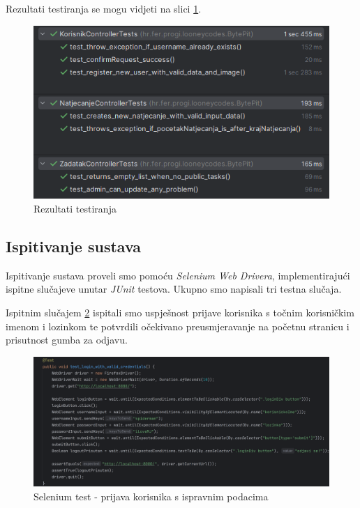 \noindent Rezultati testiranja se mogu vidjeti na slici \ref{fig:test_rezultati}.

\begin{figure}[H]
	\includegraphics[scale=0.8]{slike/test_rezultati.png}
	\centering
	\caption{Rezultati testiranja}
	\label{fig:test_rezultati}
\end{figure}

\subsection{Ispitivanje sustava}

Ispitivanje sustava proveli smo pomoću \textit{Selenium Web Drivera}, implementirajući ispitne slučajeve unutar \textit{JUnit} testova. Ukupno smo napisali tri testna slučaja.

\vspace{1em}

Ispitnim slučajem \ref{fig:selenium1} ispitali smo uspješnost prijave korisnika s točnim korisničkim imenom i lozinkom te potvrdili očekivano preusmjeravanje na početnu stranicu i prisutnost gumba za odjavu.


\begin{figure}[H]
	\includegraphics[scale=0.15]{slike/selenium_test1.png}
	\centering
	\caption{Selenium test - prijava korisnika s ispravnim podacima}
	\label{fig:selenium1}
\end{figure}

